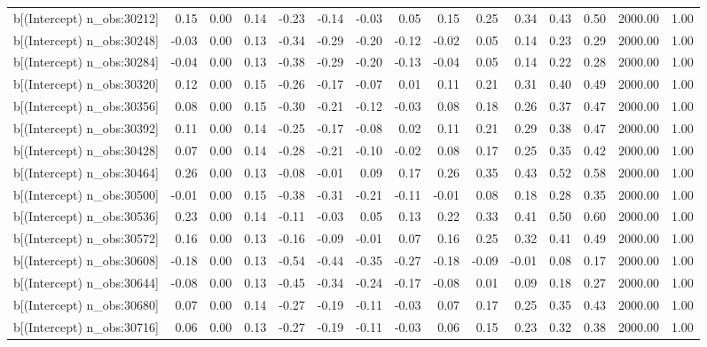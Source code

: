 \begin{table}[ht]
\begin{tabular}{rrrrrrrrrrrrrrr}
  b[(Intercept) n\_obs:30212] & 0.15 & 0.00 & 0.14 & -0.23 & -0.14 & -0.03 & 0.05 & 0.15 & 0.25 & 0.34 & 0.43 & 0.50 & 2000.00 & 1.00 \\ 
  b[(Intercept) n\_obs:30248] & -0.03 & 0.00 & 0.13 & -0.34 & -0.29 & -0.20 & -0.12 & -0.02 & 0.05 & 0.14 & 0.23 & 0.29 & 2000.00 & 1.00 \\ 
  b[(Intercept) n\_obs:30284] & -0.04 & 0.00 & 0.13 & -0.38 & -0.29 & -0.20 & -0.13 & -0.04 & 0.05 & 0.14 & 0.22 & 0.28 & 2000.00 & 1.00 \\ 
  b[(Intercept) n\_obs:30320] & 0.12 & 0.00 & 0.15 & -0.26 & -0.17 & -0.07 & 0.01 & 0.11 & 0.21 & 0.31 & 0.40 & 0.49 & 2000.00 & 1.00 \\ 
  b[(Intercept) n\_obs:30356] & 0.08 & 0.00 & 0.15 & -0.30 & -0.21 & -0.12 & -0.03 & 0.08 & 0.18 & 0.26 & 0.37 & 0.47 & 2000.00 & 1.00 \\ 
  b[(Intercept) n\_obs:30392] & 0.11 & 0.00 & 0.14 & -0.25 & -0.17 & -0.08 & 0.02 & 0.11 & 0.21 & 0.29 & 0.38 & 0.47 & 2000.00 & 1.00 \\ 
  b[(Intercept) n\_obs:30428] & 0.07 & 0.00 & 0.14 & -0.28 & -0.21 & -0.10 & -0.02 & 0.08 & 0.17 & 0.25 & 0.35 & 0.42 & 2000.00 & 1.00 \\ 
  b[(Intercept) n\_obs:30464] & 0.26 & 0.00 & 0.13 & -0.08 & -0.01 & 0.09 & 0.17 & 0.26 & 0.35 & 0.43 & 0.52 & 0.58 & 2000.00 & 1.00 \\ 
  b[(Intercept) n\_obs:30500] & -0.01 & 0.00 & 0.15 & -0.38 & -0.31 & -0.21 & -0.11 & -0.01 & 0.08 & 0.18 & 0.28 & 0.35 & 2000.00 & 1.00 \\ 
  b[(Intercept) n\_obs:30536] & 0.23 & 0.00 & 0.14 & -0.11 & -0.03 & 0.05 & 0.13 & 0.22 & 0.33 & 0.41 & 0.50 & 0.60 & 2000.00 & 1.00 \\ 
  b[(Intercept) n\_obs:30572] & 0.16 & 0.00 & 0.13 & -0.16 & -0.09 & -0.01 & 0.07 & 0.16 & 0.25 & 0.32 & 0.41 & 0.49 & 2000.00 & 1.00 \\ 
  b[(Intercept) n\_obs:30608] & -0.18 & 0.00 & 0.13 & -0.54 & -0.44 & -0.35 & -0.27 & -0.18 & -0.09 & -0.01 & 0.08 & 0.17 & 2000.00 & 1.00 \\ 
  b[(Intercept) n\_obs:30644] & -0.08 & 0.00 & 0.13 & -0.45 & -0.34 & -0.24 & -0.17 & -0.08 & 0.01 & 0.09 & 0.18 & 0.27 & 2000.00 & 1.00 \\ 
  b[(Intercept) n\_obs:30680] & 0.07 & 0.00 & 0.14 & -0.27 & -0.19 & -0.11 & -0.03 & 0.07 & 0.17 & 0.25 & 0.35 & 0.43 & 2000.00 & 1.00 \\ 
  b[(Intercept) n\_obs:30716] & 0.06 & 0.00 & 0.13 & -0.27 & -0.19 & -0.11 & -0.03 & 0.06 & 0.15 & 0.23 & 0.32 & 0.38 & 2000.00 & 1.00 \\ 

\end{tabular}
\end{table}
